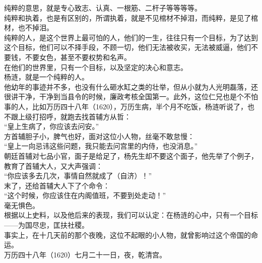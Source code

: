 \begin{multicols}{\theparacolNo}
纯粹的意思，就是专心致志、认真、一根筋、二杆子等等等等。\\

纯粹和执着，也是有区别的，所谓执着，就是不见棺材不掉泪，而纯粹，是见了棺材，也不掉泪。\\

纯粹的人，是这个世界上最可怕的人，他们的一生，往往只有一个目标，为了达到这个目标，他们可以不择手段，不顾一切，他们无法被收买，无法被威逼，他们不要钱，不要女色，甚至不要权势和名声。\\

在他们的世界里，只有一个目标，以及坚定的决心和意志。\\

杨涟，就是一个纯粹的人。\\

他幼年的事迹并不多，也没有什么砸水缸之类的壮举，但从小就为人光明磊落，还很讲干净，干净到当县令的时候，廉政考核全国第一。此外，这位仁兄也是个不怕事的人，比如万历四十八年（1620），万历生病，半个月不吃饭，杨涟听说了，也不跟上级打招呼，就跑去找首辅方从哲：\\

“皇上生病了，你应该去问安。”\\

方首辅胆子小，脾气也好，面对这位小人物，丝毫不敢怠慢：\\

“皇上一向忌讳这些问题，我只能去问宫里的内侍，也没消息。”\\

朝廷首辅对七品小官，面子是给足了，杨先生却不要这个面子，他先举了个例子，教育了首辅大人，又大声强调：\\

“你应该多去几次，事情自然就成了（自济）！”\\

末了，还给首辅大人下了个命令：\\

“这个时候，你应该住在内阁值班，不要到处走动！”\\

毫无惧色。\\

根据以上史料，以及他后来的表现，我们可以认定：在杨涟的心中，只有一个目标——为国尽忠，匡扶社稷。\\

事实上，在十几天前的那个夜晚，这位不起眼的小人物，就曾影响过这个帝国的命运。\\

万历四十八年（1620）七月二十一日，夜，乾清宫。\\


\end{multicols}
